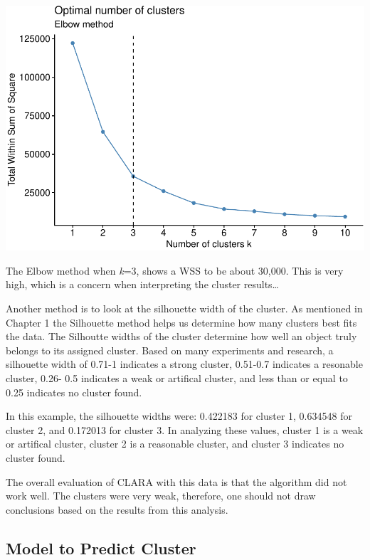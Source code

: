 \documentclass[12pt,twoside]{amherstthesis}
\begin{document}
  \begin{center}\includegraphics{Comps_Proj_files/figure-latex/unnamed-chunk-11-1} \end{center}
  
  The Elbow method when \emph{k}=3, shows a WSS to be about 30,000. This
  is very high, which is a concern when interpreting the cluster
  results\ldots{}
  
  Another method is to look at the silhouette width of the cluster. As
  mentioned in Chapter 1 the Silhouette method helps us determine how many
  clusters best fits the data. The Silhoutte widths of the cluster
  determine how well an object truly belongs to its assigned cluster.
  Based on many experiments and research, a silhouette width of 0.71-1
  indicates a strong cluster, 0.51-0.7 indicates a resonable cluster,
  0.26- 0.5 indicates a weak or artifical cluster, and less than or equal
  to 0.25 indicates no cluster found.
  
  In this example, the silhouette widths were: 0.422183 for cluster 1,
  0.634548 for cluster 2, and 0.172013 for cluster 3. In analyzing these
  values, cluster 1 is a weak or artifical cluster, cluster 2 is a
  reasonable cluster, and cluster 3 indicates no cluster found.
  
  The overall evaluation of CLARA with this data is that the algorithm did
  not work well. The clusters were very weak, therefore, one should not
  draw conclusions based on the results from this analysis.
  
  \subsection{Model to Predict Cluster}\label{model-to-predict-cluster}
  
\end{document}
